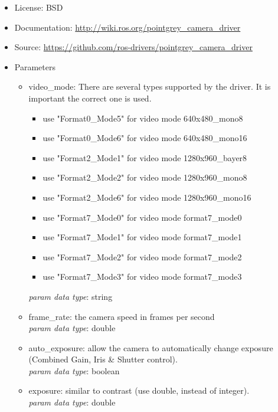 \begin{itemize}
\item License: BSD
\item Documentation: \url{http://wiki.ros.org/pointgrey_camera_driver}
\item Source: \url{https://github.com/ros-drivers/pointgrey_camera_driver}
\item Parameters
\begin{itemize}
\item video\_mode: There are several types supported by the driver. It is important the correct one is used. 
\begin{itemize}
\item use "Format0\_Mode5" for video mode 640x480\_mono8
\item use "Format0\_Mode6" for video mode 640x480\_mono16
\item use "Format2\_Mode1" for video mode 1280x960\_bayer8
\item use "Format2\_Mode2" for video mode 1280x960\_mono8
\item use "Format2\_Mode6" for video mode 1280x960\_mono16
\item use "Format7\_Mode0" for video mode format7\_mode0
\item use "Format7\_Mode1" for video mode format7\_mode1
\item use "Format7\_Mode2" for video mode format7\_mode2
\item use "Format7\_Mode3" for video mode format7\_mode3
\end{itemize} 
\textit{param data type}: string

\item frame\_rate:  the camera speed in frames per second \\
\textit{param data type}: double

\item auto\_exposure:  allow the camera to automatically change exposure (Combined Gain, Iris \& Shutter control).\\
\textit{param data type}: boolean

\item exposure: similar to contrast (use double, instead of integer).\\
\textit{param data type}: double


\end{itemize}
\end{itemize}
